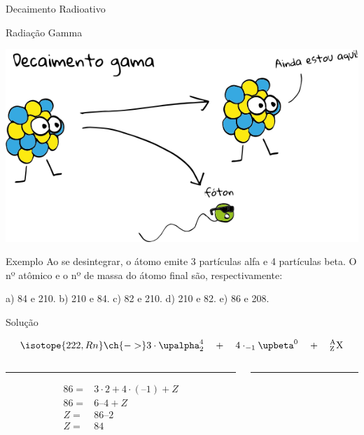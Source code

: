 \documentclass[presentation]{beamer}
\begin{document}
\begin{frame}[label={sec:org4501f1e}]{Decaimento Radioativo}
\begin{block}{Radiação Gamma}
\begin{center}
\includegraphics[scale=.3]{./gama.png}
\end{center}
\end{block}



\begin{block}{}
\vspace{-1cm}
\begin{boxex}{Exemplo}
Ao se desintegrar, o átomo  emite 3 partículas alfa e 4 partículas beta. O nº atômico e o nº de massa do átomo final são, respectivamente:

a) 84 e 210. \qquad     b) 210 e 84.  \qquad    c) 82 e 210. \qquad    d) 210 e 82. \qquad    e) 86 e 208.

\begin{myrule}{Solução}


\begin{align*}
\isotope{222,Rn} \ch{->} 3 \cdot  \upalpha_2^4 \quad  +  \quad 4 \cdot_{-1}\upbeta^0 \quad + \quad  \rm{}_Z^AX
\end{align*}

\begin{columns}[T] %
\begin{column}{.48\textwidth}
\color{red}\rule{\linewidth}{4pt}

\begin{align*}
	86 = & 3 \cdot 2 + 4 \cdot (– 1) + Z \\
	86 = & 6 – 4 + Z \\
	Z = & 86 – 2 \\
	Z = & 84
\end{align*}

\end{column}%
\hfill%
\begin{column}{.48\textwidth}
\color{blue}\rule{\linewidth}{4pt}


\end{column}
\end{columns}
\end{myrule}
\end{boxex}
\end{block}
\end{frame}
\end{document}
